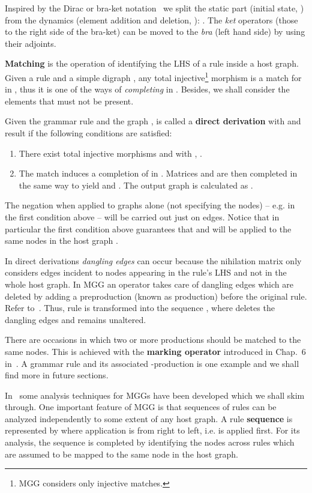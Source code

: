 \documentclass{fundam}
\begin{document}
Inspired by the Dirac or bra-ket notation~\cite{braket} we split the
static part (initial state, ) from the dynamics (element addition
and deletion, ): . The \emph{ket} operators (those to the right side of the
bra-ket) can be moved to the \emph{bra} (left hand side) by using
their adjoints.

\textbf{Matching} is the operation of identifying the LHS of a rule
inside a host graph. Given a rule  and a simple
digraph , any total injective\footnote{MGG considers only injective
  matches.} morphism  is a match for  in ,
thus it is one of the ways of {\em completing}  in . Besides, we
shall consider the elements that must not be present.

Given the grammar rule  and the graph ,  is called a \textbf{direct
  derivation} with  and result  if the following conditions are satisfied:
\begin{enumerate}
\item There exist total injective morphisms 
  and  with ,
  .
\item The match  induces a completion of  in . Matrices
   and  are then completed in the same way to yield  and
  . The output graph is calculated as .
\end{enumerate}

The negation when applied to graphs alone (not specifying the nodes)
-- e.g.  in the first condition above -- will be carried
out just on edges. Notice that in particular the first condition above
guarantees that  and  will be applied to the same nodes in the
host graph .

In direct derivations \emph{dangling edges} can occur because the
nihilation matrix only considers edges incident to nodes appearing in
the rule's LHS and not in the whole host graph. In MGG an operator
 takes care of dangling edges which are deleted by
adding a preproduction (known as production) before the
original rule. Refer to~\cite{JuanPP_1, JuanPP_2}. Thus, rule  is
transformed into the sequence , where
 deletes the dangling edges and  remains
unaltered.

There are occasions in which two or more productions should be matched
to the same nodes. This is achieved with the \textbf{marking operator}
 introduced in Chap.~6 in~\cite{MGGBook}. A grammar rule and
its associated -production is one example and we shall
find more in future sections.

In~\cite{JuanPP_1,JuanPP_2,JuanPP_4,MGGBook} some analysis techniques
for MGGs have been developed which we shall skim through. One
important feature of MGG is that sequences of rules can be analyzed
independently to some extent of any host graph. A rule
\textbf{sequence} is represented by  where
application is from right to left, i.e.  is applied first. For
its analysis, the sequence is completed by identifying the nodes
across rules which are assumed to be mapped to the same node in the
host graph.
\end{document}
